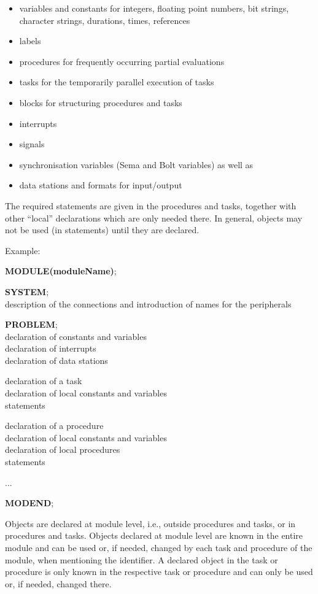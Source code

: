 \begin{itemize}
\item variables and constants for integers, floating point numbers, bit
strings, character strings, durations, times, references
\item labels
\item procedures for frequently occurring partial evaluations
\item tasks for the temporarily parallel execution of tasks
\item blocks for structuring procedures and tasks
\item interrupts
\item signals
\item synchronisation variables (Sema and Bolt variables) as well as
\item data stations and formats for input/output
\end{itemize}

The required statements are given in the procedures and tasks,
together with other ``local'' declarations which are only needed there.
In general, objects may not be used (in statements) until they are
declared.

Example:

{\bf MODULE(moduleName)};

{\bf SYSTEM};\\
\x description of the connections and introduction of names for the
peripherals

{\bf PROBLEM};\\
\x declaration of constants and variables\\
\x declaration of interrupts\\
\x declaration of data stations

\x declaration of a task\\
\x \x declaration of local constants and variables\\
\x \x statements

\x declaration of a procedure\\
\x \x declaration of local constants and variables\\
\x \x declaration of local procedures\\
\x \x statements

...

{\bf MODEND};

Objects are declared at module level, i.e., outside procedures and
tasks, or in procedures and tasks. Objects declared at module level are
known in the entire module and can be used or, if needed, changed by
each task and procedure of the module, when mentioning the identifier.
A declared object in the task or procedure is only known in the
respective task or procedure and can only be used or, if needed,
changed there.

